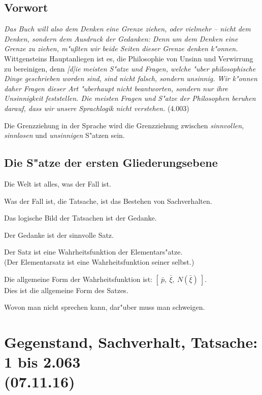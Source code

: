 \documentclass[emulatestandardclasses]{scrartcl}
\begin{document}
\subsection{Vorwort}

\emph{Das Buch will also dem Denken eine Grenze ziehen, oder vielmehr --	
 nicht dem Denken, sondern dem Ausdruck der Gedanken: Denn um dem Denken eine Grenze zu ziehen, m"ußten wir beide Seiten dieser Grenze denken k"onnen.} Wittgensteins Hauptanliegen ist es, die Philosophie von Unsinn und Verwirrung zu bereinigen, denn \emph{[d]ie meisten S"atze und Fragen, welche "uber philosophische Dinge geschrieben worden sind, sind nicht falsch, sondern unsinnig. Wir k"onnen daher Fragen dieser Art "uberhaupt nicht beantworten, sondern nur ihre Unsinnigkeit feststellen. Die meisten Fragen und S"atze der Philosophen beruhen darauf, dass wir unsere Sprachlogik nicht verstehen.} (4.003)

Die Grenzziehung in der Sprache wird die Grenzziehung zwischen \emph{sinnvollen}, \emph{sinnlosen} und \emph{unsinnigen} S"atzen sein.

\subsection{Die S"atze der ersten Gliederungsebene}
\begin{description}[leftmargin=!,labelwidth=\widthof{\bfseries 12}]
  \item[1] Die Welt ist alles, was der Fall ist.
  \item[2] Was der Fall ist, die Tatsache, ist das Bestehen von Sachverhalten.
  \item[3] Das logische Bild der Tatsachen ist der Gedanke.
  \item[4] Der Gedanke ist der sinnvolle Satz.
  \item[5] Der Satz ist eine Wahrheitsfunktion der Elementars"atze.\\
(Der Elementarsatz ist eine Wahrheitsfunktion seiner selbst.)
  \item[6] Die allgemeine Form der Wahrheitsfunktion ist: $[~\bar{p},~\bar{\xi},~N(\bar{\xi})~]$.\\
Dies ist die allgemeine Form des Satzes.
  \item[7] Wovon man nicht sprechen kann, dar"uber muss man schweigen.
\end{description}

\section{Gegenstand, Sachverhalt, Tatsache: 1 bis 2.063\\(07.11.16)}
\end{document}
